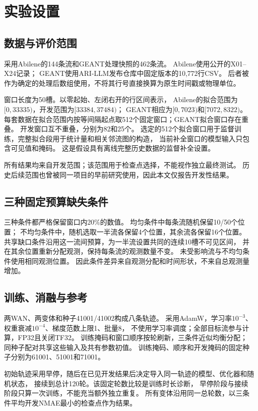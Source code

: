 \section{实验设置}
\subsection{数据与评价范围}
采用Abilene的144条流和GEANT处理快照的462条流。
Abilene使用公开的X01--X24记录\cite{abilene_data}；
GEANT使用ARI-LLM发布仓库中固定版本的10,772行CSV\cite{ari_release}。
后者被作为确定的处理后数组使用，不将其行号直接换算为原生时间戳或物理单位。

窗口长度为50槽。以零起始、左闭右开的行区间表示，
Abilene的拟合范围为$[0,33335)$，开发范围为$[33384,37484)$；
GEANT相应为$[0,7023)$和$[7072,8322)$。
每套数据在拟合范围内按等间隔起点取512个固定窗口；GEANT拟合窗口存在重叠。
开发窗口互不重叠，分别为82和25个。
选定的512个拟合窗口用于监督训练，完整拟合段用于统计量和相关邻流图的构造，
当前补全窗口的模型输入只包含可见值和掩码。
这是假设具有离线完整历史数据的监督补全设置。

所有结果均来自开发范围；该范围用于检查点选择，不能视作独立最终测试。
历史后续范围也曾被同一项目的早前研究使用，因此本文仅报告开发性结果。
\subsection{三种固定预算缺失条件}
三种条件都严格保留窗口内20\%的数值。
均匀条件中每条流随机保留10/50个位置；
不均匀条件中，随机选取一半流各保留4个位置，其余流各保留16个位置。
共享缺口条件沿用这一流间预算，为一半流设置共同的连续10槽不可见区间，
并在其余位置重新分配观测，保持每条流的观测数量不变。
未受影响流与不均匀条件使用相同观测位置。
因此条件差异来自观测分配和时间形状，不来自总观测量增加。

\subsection{训练、消融与参考}
两WAN、两变体和种子41001/41002构成八条轨迹。
采用AdamW，学习率$10^{-3}$、权重衰减$10^{-4}$、梯度范数上限1、批量8，
不使用学习率调度；全部目标流参与计算，FP32且关闭TF32。
训练掩码和窗口顺序按轮刷新，三条件近似均衡分配；
同种子配对共享这些输入及共有参数初值。
训练掩码、顺序和开发掩码的固定种子分别为61001、51001和71001。

初始轨迹采用早停，随后在已见开发结果后决定导入同一轨迹的模型、优化器和随机状态，
接续到总计120轮。该固定轮数比较是训练时长诊断，
早停阶段与接续阶段只算一次训练，不能充当额外独立重复。
所有变体沿用同一总轮数，以三条件平均开发NMAE最小的检查点作为结果。

